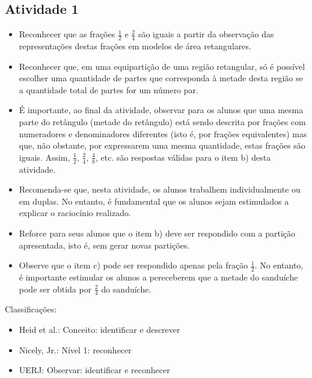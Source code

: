 \documentclass[oneside]{book}
\begin{document}
\begin{multicols}{2}



\subsection{Atividade 1}

\begin{itemize} %
    \item       Reconhecer que as frações       $\frac{1}{2}$       e       
$\frac{2}{4}$       são iguais a partir da observação das representações destas 
frações em modelos de área retangulares.
    \item       Reconhecer que, em uma equipartição de uma região retangular, só 
é possível escolher uma quantidade de partes que corresponda à metade desta 
região se a quantidade total de partes for um número par.
    \item       É importante, ao final da atividade, observar para os alunos que 
uma mesma parte do retângulo (metade do retângulo) está sendo descrita por 
frações com numeradores e denominadores diferentes (isto é, por frações 
equivalentes) mas que, não obstante, por expressarem uma mesma quantidade, estas 
frações são iguais. Assim,       $\frac{1}{2}$,       $\frac{2}{4}$,       
$\frac{4}{8}$, etc. são respostas válidas para o item b) desta atividade.
\end{itemize} %
  
  
 
  
\begin{itemize} %
    \item       Recomenda-se que, nesta atividade, os alunos trabalhem 
individualmente ou em duplas. No entanto, é fundamental que os alunos sejam 
estimulados a explicar o raciocínio realizado.
    \item       Reforce para seus alunos que o item b) deve ser respondido com a 
partição apresentada, isto é, sem gerar novas partições.
    \item       Observe que o item c) pode ser respondido apenas pela fração     
  $\frac{1}{2}$. No entanto, é importante estimular os alunos a pereceberem que 
a metade do sanduíche pode ser obtida por       $\frac{2}{4}$       do 
sanduíche. 
\end{itemize} %
  
  
  Classificações:  
\begin{itemize} %
    \item       Heid et al.: Conceito: identificar e descrever
    \item       Nicely, Jr.: Nível 1: reconhecer
    \item       UERJ: Observar: identificar e reconhecer
\end{itemize} %
  


\end{multicols}
\end{document}

